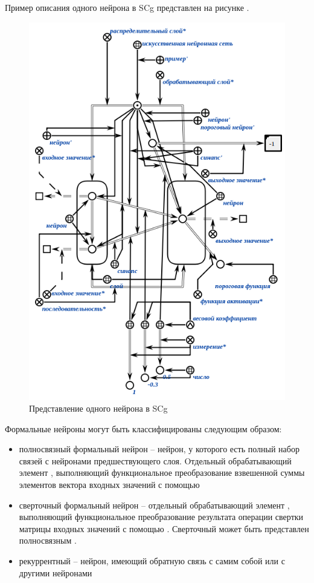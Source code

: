 Пример описания одного нейрона в SCg представлен на рисунке \textit{}.

\begin{figure}[H]
	\includegraphics[scale=0.8]{author/part3/figures/neural_network_scg.png}
	\caption{Представление одного нейрона в SCg}
	\label{fig:nn_scg}
\end{figure}

Формальные нейроны могут быть классифицированы следующим образом:

\begin{itemize}
		\item полносвязный формальный нейрон -- нейрон, у которого есть полный набор связей с нейронами предшествующего слоя. Oтдельный обрабатывающий элемент , выполняющий функциональное преобразование взвешенной суммы элементов вектора входных значений с помощью 
	 \item сверточный формальный нейрон -- отдельный обрабатывающий элемент , выполняющий функциональное преобразование результата операции свертки матрицы входных значений с помощью . Сверточный  может быть представлен полносвязным .
	\item рекуррентный  -- нейрон, имеющий обратную связь с самим собой или с другими нейронами 
\end{itemize}


